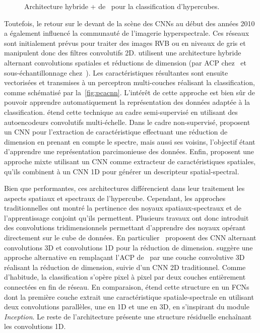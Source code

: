 \begin{figure}[h]
  \resizebox{\textwidth}{!}{}
  \caption[Architecture hybride + pour la classification d'hypercubes.]{Architecture hybride + de~\citet{makantasis_deep_2015} pour la classification d'hypercubes.}
\end{figure}

Toutefois, le retour sur le devant de la scène des \glspl{CNN} au début des années 2010 a également influencé la communauté de l'imagerie hyperspectrale. Ces réseaux sont initialement prévus pour traiter des images \gls{RVB} ou en niveaux de gris et manipulent donc des filtres convolutifs 2D. \citet{makantasis_deep_2015,slavkovikj_hyperspectral_2015} utilisent une architecture hybride alternant convolutions spatiales et réductions de dimension (par \gls{ACP} chez~\citet{makantasis_deep_2015} et sous-échantillonnage chez~\citet{slavkovikj_hyperspectral_2015}). Les caractéristiques résultantes sont ensuite vectorisées et transmises à un perceptron multi-couches réalisant la classification, comme schématisé par la~\cref{fig:pcacnn}. L'intérêt de cette approche est bien sûr de pouvoir apprendre automatiquement la représentation des données adaptée à la classification. \citet{zhao_combining_2015} étend cette technique au cadre semi-supervisé en utilisant des autoencodeurs convolutifs multi-échelle. Dans le cadre non-supervisé, \citet{romero_unsupervised_2015} proposent un \gls{CNN} pour l'extraction de caractéristique effectuant une réduction de dimension en prenant en compte le spectre, mais aussi ses voisins, l'objectif étant d'apprendre une représentation parcimonieuse des données. Enfin, \citet{zhao_spectral-spatial_2016,yue_spectral-spatial_2015} proposent une approche mixte utilisant un \gls{CNN} comme extracteur de caractéristiques spatiales, qu'ils combinent à un \gls{CNN} 1D pour générer un descripteur spatial-spectral.


Bien que performantes, ces architectures différencient dans leur traitement les aspects spatiaux et spectraux de l'hypercube. Cependant, les approches traditionnelles ont montré la pertinence des noyaux spatiaux-spectraux et de l'apprentissage conjoint qu'ils permettent. Plusieurs travaux ont donc introduit des convolutions tridimensionnels permettant d'apprendre des noyaux opérant directement sur le cube de données. En particulier~\citet{ben_hamida_deep_2016,chen_deep_2016} proposent des \gls{CNN} alternant convolutions 3D et convolutions 1D pour la réduction de dimension. \citet{luo_hsi-cnn_2018} suggère une approche alternative en remplaçant l'\gls{ACP} de~\citet{slavkovikj_hyperspectral_2015} par une couche convolutive 3D réalisant la réduction de dimension, suivie d'un \gls{CNN} 2D traditionnel. Comme d'habitude, la classification s'opère pixel à pixel par deux couches entièrement connectées en fin de réseau. En comparaison, \citet{lee_contextual_2016} étend cette structure en un \glspl{FCN} dont la première couche extrait une caractéristique spatiale-spectrale en utilisant deux convolutions parallèles, une en 1D et une en 3D, en s'inspirant du module \emph{Inception}. Le reste de l'architecture présente une structure résiduelle enchaînant les convolutions 1D.

